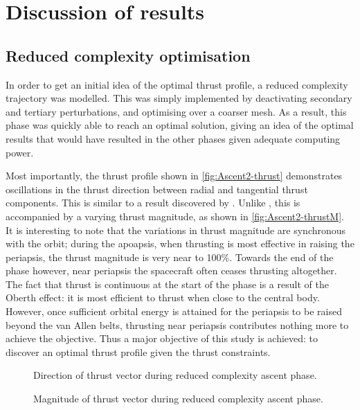 \chapter{Discussion of results} \label{cha:Discussion-of-results}

\section{Reduced complexity optimisation} \label{sec:Reduced-complexity}

In order to get an initial idea of the optimal thrust profile, a reduced complexity trajectory was modelled. This was simply implemented by deactivating secondary and tertiary perturbations, and optimising over a coarser mesh. As a result, this phase was quickly able to reach an optimal solution, giving an idea of the optimal results that would have resulted in the other phases given adequate computing power.

Most importantly, the thrust profile shown in \autoref{fig:Ascent2-thrust} demonstrates oscillations in the thrust direction between radial and tangential thrust components. This is similar to a result discovered by \textcite{Betts2003}. Unlike \textcite{Betts2003}, this is accompanied by a varying thrust magnitude, as shown in \autoref{fig:Ascent2-thrustM}. It is interesting to note that the variations in thrust magnitude are synchronous with the orbit; during the apoapsis, when thrusting is most effective in raising the periapsis, the thrust magnitude is very near to 100\%. Towards the end of the phase however, near periapsis the spacecraft often ceases thrusting altogether. The fact that thrust is continuous at the start of the phase is a result of the Oberth effect: it is most efficient to thrust when close to the central body. However, once sufficient orbital energy is attained for the periapsis to be raised beyond the van Allen belts, thrusting near periapsis contributes nothing more to achieve the objective. Thus a major objective of this study is achieved: to discover an optimal thrust profile given the thrust constraints.

\begin{figure}
\caption{Direction of thrust vector during reduced complexity ascent phase.}
\label{fig:Ascent2-thrust}
\centering
\def\svgwidth{\figurewidth}

\end{figure}

\begin{figure}
\caption{Magnitude of thrust vector during reduced complexity ascent phase.}
\label{fig:Ascent2-thrustM}
\centering
\def\svgwidth{\figurewidth}

\end{figure}

